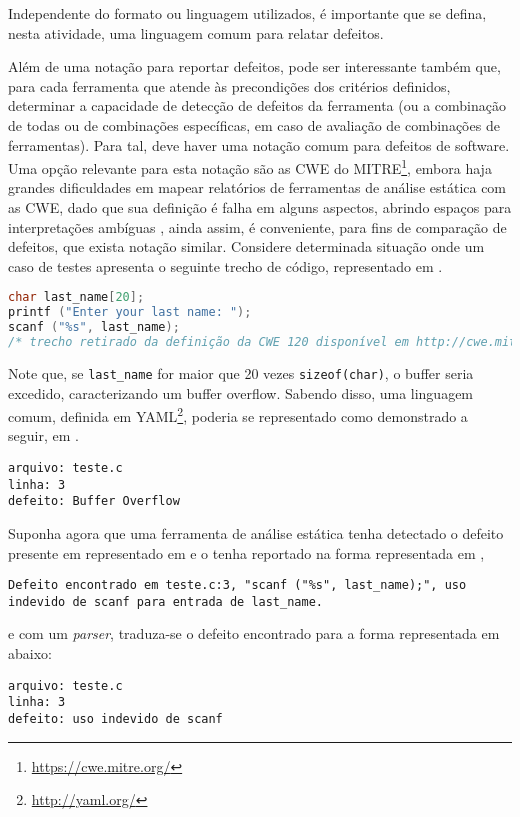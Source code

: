 Independente do formato ou linguagem utilizados, é importante que se defina, nesta atividade, uma linguagem comum para relatar defeitos.

Além de uma notação para reportar defeitos, pode ser interessante também que, para cada ferramenta que atende às precondições dos critérios definidos, determinar a capacidade de detecção de defeitos da ferramenta (ou a combinação de todas ou de combinações específicas, em caso de avaliação de combinações de ferramentas). Para tal, deve haver uma notação comum para defeitos de software.  Uma opção relevante para esta notação são as CWE do  MITRE\footnote{\url{https://cwe.mitre.org/}}, embora haja grandes dificuldades em mapear relatórios de ferramentas de análise estática com as CWE, dado que sua definição é falha em alguns aspectos, abrindo espaços para interpretações ambíguas \cite{yan}, ainda assim, é conveniente, para fins de comparação de defeitos, que exista notação similar. Considere determinada situação onde um caso de testes apresenta o seguinte trecho de código, representado em .

\begin{lstlisting}[language=C, title=cwe120.c, caption=Exemplo de CWE 120, label=exemplo_cwe120]
char last_name[20];
printf ("Enter your last name: ");
scanf ("%s", last_name);
/* trecho retirado da definição da CWE 120 disponível em http://cwe.mitre.org/data/definitions/120.html */
\end{lstlisting}

Note que, se \lstinline{last_name} for maior que 20 vezes \lstinline{sizeof(char)}, o buffer seria excedido, caracterizando um buffer overflow. Sabendo disso, uma linguagem comum, definida em YAML\footnote{\url{http://yaml.org/}}, poderia se representado como demonstrado a seguir, em .

\begin{lstlisting}[caption=Relatório de erros do Exemplo de CWE 120,label=relatorio_cwe120]
arquivo: teste.c
linha: 3
defeito: Buffer Overflow
\end{lstlisting}

Suponha agora que uma ferramenta de análise estática tenha detectado o defeito presente em  representado em  e o tenha reportado na forma representada em ,
\begin{lstlisting}[caption=Relatório de análise de uma ferramenta qualquer, label=relatorio_ferramenta_qualquer]
Defeito encontrado em teste.c:3, "scanf ("%s", last_name);", uso indevido de scanf para entrada de last_name.
\end{lstlisting}
e com um \textit{parser}, traduza-se o defeito encontrado para a forma representada em  abaixo:
\begin{lstlisting}[label=relatorio_ferramenta_qualquer_yaml, caption=Relatório de uma ferramenta qualquer em YAML]
arquivo: teste.c
linha: 3
defeito: uso indevido de scanf
\end{lstlisting}

